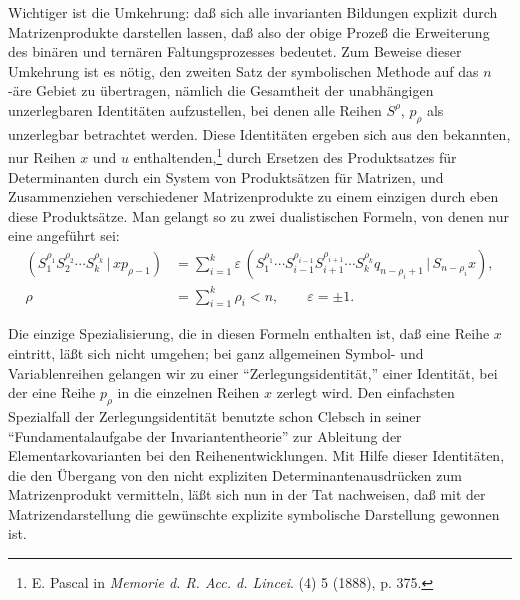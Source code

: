 \documentclass[11pt]{article}
\providecommand{\pair}[2]{(#1\,|\,#2)}
\providecommand{\eps}{\varepsilon}
\begin{document}
Wichtiger ist die Umkehrung: daß sich alle invarianten Bildungen explizit durch Matrizenprodukte darstellen lassen, daß also der obige Prozeß die Erweiterung des binären und ternären Faltungsprozesses bedeutet. Zum Beweise dieser Umkehrung ist es nötig, den zweiten Satz der symbolischen Methode auf das $n$-äre Gebiet zu übertragen, nämlich die Gesamtheit der unabhängigen unzerlegbaren Identitäten aufzustellen, bei denen alle Reihen $S^\rho$, $p_\rho$ als unzerlegbar betrachtet werden. Diese Identitäten ergeben sich aus den bekannten, nur Reihen $x$ und $u$ enthaltenden,\footnote{E. Pascal in \emph{Memorie d. R. Acc. d. Lincei}. (4) 5 (1888), p. 375.} durch Ersetzen des Produktsatzes für Determinanten durch ein System von Produktsätzen für Matrizen, und Zusammenziehen verschiedener Matrizenprodukte zu einem einzigen durch eben diese Produktsätze. Man gelangt so zu zwei dualistischen Formeln, von denen nur eine angeführt sei:
\begin{equation}
\begin{aligned}
 \pair{S_1^{\rho_1}S_2^{\rho_2}\cdots S_k^{\rho_k}}{x p_{\rho-1}}
 &=\sum_{i=1}^{k}\eps\,\pair{S_1^{\rho_1}\cdots S_{i-1}^{\rho_{i-1}}S_{i+1}^{\rho_{i+1}}\cdots S_k^{\rho_k}q_{n-\rho_i+1}}{S_{n-\rho_i}x},\\
 \rho&=\sum_{i=1}^{k}\rho_i<n,\qquad \eps=\pm1.
\end{aligned}
\tag{2}
\end{equation}

Die einzige Spezialisierung, die in diesen Formeln enthalten ist, daß eine Reihe $x$ eintritt, läßt sich nicht umgehen; bei ganz allgemeinen Symbol- und Variablenreihen gelangen wir zu einer ``Zerlegungsidentität,'' einer Identität, bei der eine Reihe $p_\rho$ in die einzelnen Reihen $x$ zerlegt wird. Den einfachsten Spezialfall der Zerlegungsidentität benutzte schon Clebsch in seiner ``Fundamentalaufgabe der Invariantentheorie'' zur Ableitung der Elementarkovarianten bei den Reihenentwicklungen. Mit Hilfe dieser Identitäten, die den Übergang von den nicht expliziten Determinantenausdrücken zum Matrizenprodukt vermitteln, läßt sich nun in der Tat nachweisen, daß mit der Matrizendarstellung die gewünschte explizite symbolische Darstellung gewonnen ist.
\end{document}
